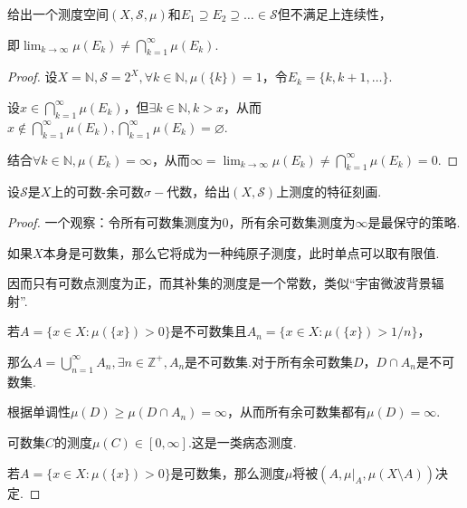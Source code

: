 \begin{problem}[10]\label{2.C.10}
    给出一个测度空间\((X, \mathcal{S}, \mu)\)和\(E_1 \supseteq E_2 \supseteq \dots \in \mathcal{S}\)但不满足上连续性，
    
    即\(\lim_{k \to \infty} \mu(E_k) \ne \bigcap_{k=1}^\infty \mu(E_k)\).
\end{problem}

\begin{proof}
    设\(X=\mathbb{N}, \mathcal{S}=2^X, \forall k \in \mathbb{N}, \mu(\{k\})=1\)，令\(E_k=\{k, k+1, \dots\}\).

    设\(x \in \bigcap_{k=1}^\infty \mu(E_k)\)，但\(\exists k \in \mathbb{N}, k>x\)，从而\(x \notin \bigcap_{k=1}^\infty \mu(E_k), \bigcap_{k=1}^\infty \mu(E_k)=\varnothing\).

    结合\(\forall k \in \mathbb{N}, \mu(E_k)=\infty\)，从而\(\infty=\lim_{k \to \infty} \mu(E_k) \ne \bigcap_{k=1}^\infty \mu(E_k)=0\).
\end{proof}

\begin{problem}[12]\label{2.C.12}
    设\(\mathcal{S}\)是\(X\)上的可数-余可数\(\sigma-\)代数，给出\((X, \mathcal{S})\)上测度的特征刻画.
\end{problem}

\begin{proof}
    {\kaishu 一个观察：令所有可数集测度为\(0\)，所有余可数集测度为\(\infty\)是最保守的策略.

    如果\(X\)本身是可数集，那么它将成为一种纯原子测度，此时单点可以取有限值.
    
    因而只有可数点测度为正，而其补集的测度是一个常数，类似“宇宙微波背景辐射”.}

    若\(A=\{x \in X: \mu(\{x\})>0\}\)是不可数集且\(A_n=\{x \in X: \mu(\{x\})>1/n\}\)，

    那么\(A=\bigcup_{n=1}^\infty A_n, \exists n \in \mathbb{Z}^+, A_n\)是不可数集.对于所有余可数集\(D\)，\(D \cap A_n\)是不可数集.

    根据单调性\(\mu(D) \geq \mu(D \cap A_n)=\infty\)，从而所有余可数集都有\(\mu(D)=\infty\).

    可数集\(C\)的测度\(\mu(C) \in [0, \infty]\).{\kaishu 这是一类病态测度.}

    若\(A=\{x \in X: \mu(\{x\})>0\}\)是可数集，那么测度\(\mu\)将被\((A, \left.\mu\right|_A, \mu(X \setminus A))\)决定.
\end{proof}
